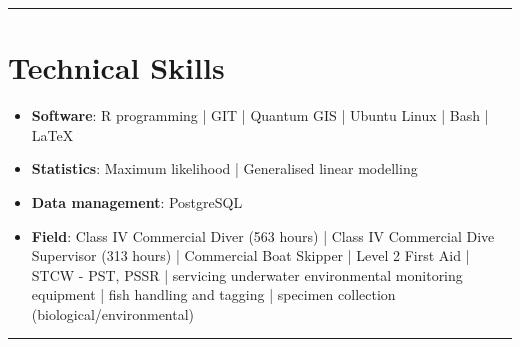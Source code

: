 \documentclass[10pt,a4paper]{article}
\begin{document}
\hrule
\vspace{6pt}
\noindent
\section*{Technical Skills}
	\begin{itemize}[itemsep=2pt, parsep=0pt]
		\setlength\itemsep{0.05em}
		\item \textbf{Software}: R programming | GIT | Quantum GIS | Ubuntu Linux | Bash | \LaTeX\
		\item \textbf{Statistics}: Maximum likelihood | Generalised linear modelling
		\item \textbf{Data management}: PostgreSQL 
		\item \textbf{Field}: Class IV Commercial Diver (563 hours) | Class IV Commercial Dive Supervisor 
		(313 hours) | Commercial Boat Skipper | Level 2 First Aid | STCW - PST, PSSR | servicing underwater environmental 
		monitoring equipment | fish handling and tagging | specimen collection (biological/environmental)
	\end{itemize}	

\hrule
\vspace{6pt}
\noindent
\end{document}
